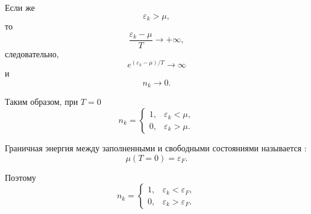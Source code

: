 \documentclass[../final.tex]{subfiles}
\begin{document}
Если же
%
\begin{equation*}
    \varepsilon_k>\mu,
\end{equation*}
%
то
%
\begin{equation*}
    \frac{
        \varepsilon_k-\mu
    }{
        T
    }
    \to
    +\infty,
\end{equation*}
%
следовательно,
%
\begin{equation*}
    e^{(\varepsilon_k-\mu)/T}
    \to
    \infty
\end{equation*}
%
и
%
\begin{equation*}
    n_k
    \to
    0.
\end{equation*}

Таким образом, при $T=0$
%
\begin{equation*}
    n_k
    =
    \begin{cases}
        1,
        &
        \varepsilon_k<\mu,
        \\[4pt]
        0,
        &
        \varepsilon_k>\mu.
    \end{cases}
\end{equation*}

Граничная энергия между заполненными и свободными состояниями
называется :
%
\begin{equation*}
    \mu(T=0)
    =
    \varepsilon_F.
\end{equation*}

Поэтому
%
\begin{equation*}
    n_k
    =
    \begin{cases}
        1,
        &
        \varepsilon_k<\varepsilon_F,
        \\[4pt]
        0,
        &
        \varepsilon_k>\varepsilon_F.
    \end{cases}
\end{equation*}
\end{document}
